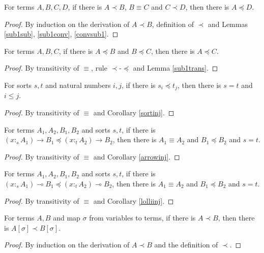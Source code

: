 \documentclass[sigplan,screen,review,anonymous]{acmart}
\newcommand{\rname}[1]{\textsc{\footnotesize #1}}
\newcommand{\stype}[1]{:_#1}
\begin{document}
\begin{lemma}\label{sub1trans}
  For terms $A, B, C, D$, if there is $A \prec B$, $B \equiv C$ and $C \prec D$, then there is $A \preceq D$.
\end{lemma}
\begin{proof}
  By induction on the derivation of $A \prec B$, definition of $\prec$ and Lemmas \ref{sub1sub}, \ref{sub1conv}, \ref{convsub1}.
\end{proof}

\begin{lemma}
  For terms $A, B, C$, if there is $A \preceq B$ and $B \preceq C$, then there is $A \preceq C$.
\end{lemma}
\begin{proof}
  By transitivity of $\equiv$, rule \rname{$\prec$-$\preceq$} and Lemma \ref{sub1trans}.
\end{proof}

\begin{lemma}
  For sorts $s, t$ and natural numbers $i, j$, if there is $s_i \preceq t_j$, then there is $s = t$ and $i \leq j$.
\end{lemma}
\begin{proof}
  By transitivity of $\equiv$ and Corollary \ref{sortinj}.
\end{proof}

\begin{lemma}
  For terms $A_1, A_2, B_1, B_2$ and sorts $s, t$, if there is $(x \stype{s} A_1) \rightarrow B_1 \preceq (x \stype{t} A_2) \rightarrow B_2$, then there is $A_1 \equiv A_2$ and $B_1 \preceq B_2$ and $s = t$.
\end{lemma}
\begin{proof}
  By transitivity of $\equiv$ and Corollary \ref{arrowinj}.
\end{proof}

\begin{lemma}
  For terms $A_1, A_2, B_1, B_2$ and sorts $s, t$, if there is $(x \stype{s} A_1) \multimap B_1 \preceq (x \stype{t} A_2) \multimap B_2$, then there is $A_1 \equiv A_2$ and $B_1 \preceq B_2$ and $s = t$.
\end{lemma}
\begin{proof}
  By transitivity of $\equiv$ and Corollary \ref{lolliinj}.
\end{proof}

\begin{lemma}\label{sub1subst}
  For terms $A, B$  and map $\sigma$ from variables to terms, if there is $A \prec B$, then there is $A[\sigma] \prec B[\sigma]$.
\end{lemma}
\begin{proof}
  By induction on the derivation of $A \prec B$ and the definition of $\prec$.
\end{proof}
\end{document}
